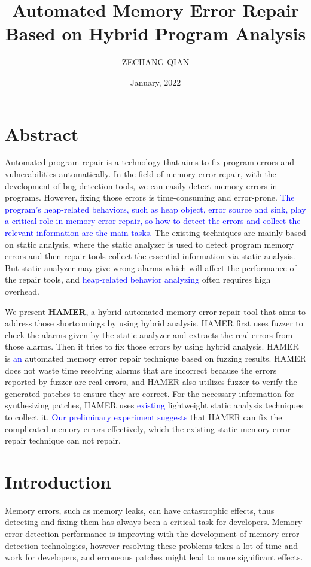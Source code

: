 \documentclass[a4paper,11pt,oneside,openany]{book}
\title{Automated Memory Error Repair\\Based on Hybrid Program Analysis}
\author{ZECHANG QIAN}
\affiliation{%
  Graduate Major in Computer Science\\
  School of Computing\\
  Tokyo Institute of Technology}
\date{January, 2022}
\begin{document}
\frontmatter
\maketitle

\chapter{Abstract}
Automated program repair is a technology that aims to fix program errors and vulnerabilities automatically. In the field of memory error repair, with the development of bug detection tools, we can easily detect memory errors in programs. However, fixing those errors is time-consuming and error-prone. \textcolor{blue}{The program's heap-related behaviors, such as heap object, error source and sink, play a critical role in memory error repair, so how to detect the errors and collect the relevant information are the main tasks.} The existing techniques are mainly based on static analysis, where the static analyzer is used to detect program memory errors and then repair tools collect the essential information via static analysis. But static analyzer may give wrong alarms which will affect the performance of the repair tools, and \textcolor{blue}{heap-related behavior analyzing} often requires high overhead. 

We present \textbf{HAMER}, a hybrid automated memory error repair tool that aims to address those 
shortcomings by using hybrid analysis. HAMER first uses fuzzer to check the alarms given by the static 
analyzer and extracts the real errors from those alarms. Then it tries to fix those errors by using 
hybrid analysis. HAMER is \textcolor{blue}{an} automated memory error repair technique based on fuzzing results. HAMER does not waste time resolving alarms that are incorrect because the errors reported by fuzzer are real errors, and HAMER also utilizes fuzzer to verify the generated patches to ensure they are correct. For the necessary information for synthesizing patches, HAMER uses \textcolor{blue}{existing} lightweight static analysis techniques to collect it. \textcolor{blue}{Our preliminary experiment suggests} that HAMER can fix the complicated memory errors effectively, which the existing static memory error repair technique can not repair.


\tableofcontents
\listoffigures
\listoftables


\mainmatter
\chapter{Introduction}
Memory errors, such as memory leaks, can have catastrophic effects,  thus detecting and fixing them has always been a critical task for developers. Memory error detection performance is improving with the development of memory error detection technologies, however resolving these problems takes a lot of time and work for developers, and erroneous patches might lead to more significant effects.
\end{document}
